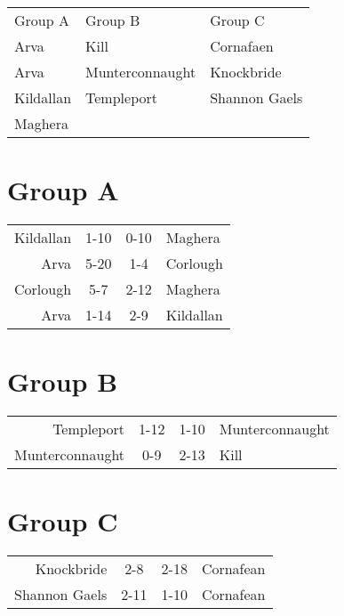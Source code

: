 \documentclass[11pt,a4paper]{article}
\begin{document}
\begin{tabular}{lll}
Group A & Group B & Group C \\
Arva & Kill & Cornafaen \\
Arva & Munterconnaught & Knockbride \\
Kildallan & Templeport & Shannon Gaels \\
Maghera & & \\
\end{tabular}

\section*{Group A}

\begin{tabular}{rccl}
Kildallan & 1-10 & 0-10 & Maghera \\
Arva & 5-20 & 1-4 & Corlough \\
Corlough & 5-7 & 2-12 & Maghera \\
Arva & 1-14 & 2-9 & Kildallan
\end{tabular}

\section*{Group B}

\begin{tabular}{rccl}
Templeport & 1-12 & 1-10 & Munterconnaught \\
Munterconnaught & 0-9 & 2-13 & Kill \\
\end{tabular}

\section*{Group C}

\begin{tabular}{rccl}
Knockbride & 2-8 & 2-18 & Cornafean \\
Shannon Gaels & 2-11 & 1-10 & Cornafean \\
\end{tabular}
\end{document}

